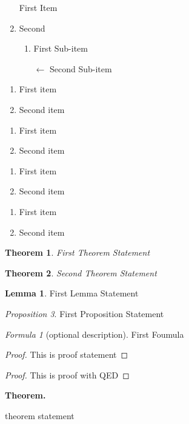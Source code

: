\documentclass{article}
\theoremstyle{plain}
\newtheorem{thm}{Theorem}
\theoremstyle{definition}
\newtheorem{lem}{Lemma}
\theoremstyle{remark}
\newtheorem{prop}[thm]{Proposition}
\newtheorem*{for}{Formula}
\newenvironment{mythm}{\noindent \textbf{Theorem.} \begin{itshape}}{\end{itshape}}
\begin{document}
    \begin{enumerate}
        \item[] First Item
        \item Second 
        \begin{enumerate}
            \item First Sub-item
            \item[$\leftarrow$] Second Sub-item
        \end{enumerate}
    \end{enumerate}

    \begin{enumerate}[label=\arabic*)]
        \item First item
        \item Second item
    \end{enumerate}
    \begin{enumerate}[label=\Roman*]
        \item First item
        \item Second item
    \end{enumerate}
    \begin{enumerate}[label=\roman*]
        \item First item
        \item Second item
    \end{enumerate}
    \begin{enumerate}[label=(\alph*)]
        \item First item
        \item Second item
    \end{enumerate}

    \begin{thm}
        First Theorem Statement
    \end{thm}
    \begin{thm}
        Second Theorem Statement
    \end{thm}

    \begin{lem}
        First Lemma Statement
    \end{lem}
    \begin{prop}
        First Proposition Statement
    \end{prop}
    \begin{for}[optional description]
        First Foumula
    \end{for}

    \begin{proof}
        This is proof statement
    \end{proof}
    \renewcommand{\qedsymbol}{Q.E.D.}
    \begin{proof}
        This is proof with QED
    \end{proof}

    \begin{mythm}
        theorem statement
    \end{mythm}
\end{document}
